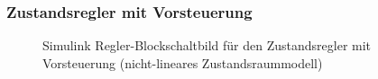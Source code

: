 \documentclass[
	pagesize,
	fontsize=12pt,
	paper=a4,
	oneside,
   reqno
]{scrartcl}
\begin{document}
\subsubsection{Zustandsregler mit Vorsteuerung}

\begin{figure}[H]
    \centering
    \caption[Regler mit Vorsteuerung Simulink (nicht-linear)]{Simulink Regler-Blockschaltbild für den Zustandsregler mit Vorsteuerung (nicht-lineares Zustandsraummodell)}
    \label{fig:Bild23.5}
\end{figure}
\end{document}

